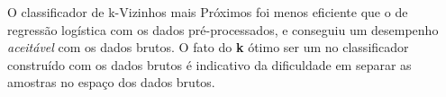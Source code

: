 \documentclass[final,5p]{elsarticle}
\numberwithin{equation}{section}
\begin{document}
        O classificador de k-Vizinhos mais Próximos foi menos eficiente que o de regressão logística com os dados pré-processados, e conseguiu um desempenho \emph{aceitável} com os dados brutos. O fato do \textbf{k} ótimo ser um no classificador construído com os dados brutos é indicativo da dificuldade em separar as amostras no espaço dos dados brutos.














\end{document}
